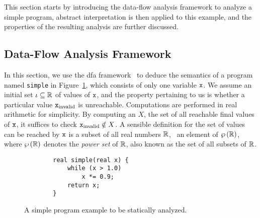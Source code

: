 This section starts by introducing the data-flow analysis framework to analyze
a simple program, abstract interpretation is then applied to this example, and
the properties of the resulting analysis are further discussed.


\subsection{Data-Flow Analysis Framework}
\label{bg:sub:data_flow}

In this section, we use the \gls{dfa} framework~\cite{nielson99} to deduce
the semantics of a program named \verb|simple| in Figure~\ref{bg:lst:simple},
which consists of only one variable $\texttt{x}$.  We assume an initial set $\iota
\subseteq \mathbb{R}$ of values of $\texttt{x}$, and the property pertaining to
us is whether a particular value $\texttt{x}_\mathrm{invalid}$ is unreachable.
Computations are performed in real arithmetic for simplicity.  By computing an
$X$, the set of all reachable final values of $\texttt{x}$, it suffices to check
$\texttt{x}_\mathrm{invalid} \notin X$.  A sensible definition for the set of
values can be reached by $\texttt{x}$ is a subset of all real numbers $\mathbb{R}$,
\ie~an element of $\wp\left({\mathbb{R}}\right)$, where $\wp\left({\mathbb{R}}\right)$ denotes
the \emph{power set} of $\mathbb{R}$, also known as the set of all subsets of
$\mathbb{R}$.
\begin{figure}[ht]
    \begin{lstlisting}
        real simple(real x) {
            while (x > 1.0)
                x *= 0.9;
            return x;
        }
    \end{lstlisting}
    \caption{%
        A simple program example to be statically analyzed.
    }\label{bg:lst:simple}
\end{figure}

